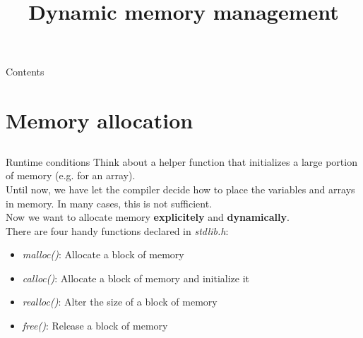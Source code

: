 
\newcommand{\topic}{
	Dynamic memory management
}
\usepackage{tikz}
\usetikzlibrary{arrows}
\usetikzlibrary{decorations.pathmorphing}

\title{\topic}
\supertitle{\course}
\date{}



\maketitle

\begin{frame}{Contents}
	\tableofcontents
\end{frame}

\section{Memory allocation}
\subsection{}
\begin{frame}[fragile]{Runtime conditions}
	Think about a helper function that initializes a large portion of memory (e.g. for an array).\\
	\bigskip
	Until now, we have let the compiler decide how to place the variables and arrays in memory. In many cases, this is not sufficient.\\
	Now we want to allocate memory \textbf{explicitely} and \textbf{dynamically}.\\
	\bigskip
	There are four handy functions declared in \textit{stdlib.h}:
	\begin{itemize}
		\item \textit{malloc()}: Allocate a block of memory
		\item \textit{calloc()}: Allocate a block of memory and initialize it
		\item \textit{realloc()}: Alter the size of a block of memory
		\item \textit{free()}: Release a block of memory
	\end{itemize}
\end{frame}

